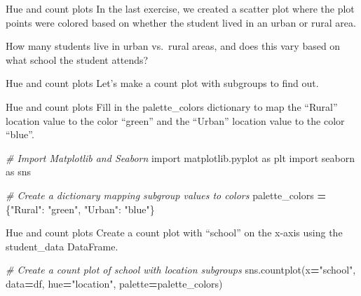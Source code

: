 \documentclass[
  ignorenonframetext,
]{beamer}
\newenvironment{Shaded}{\begin{snugshade}}{\end{snugshade}}
\newcommand{\CommentTok}[1]{\textcolor[rgb]{0.56,0.35,0.01}{\textit{#1}}}
\newcommand{\ImportTok}[1]{#1}
\newcommand{\NormalTok}[1]{#1}
\newcommand{\OperatorTok}[1]{\textcolor[rgb]{0.81,0.36,0.00}{\textbf{#1}}}
\newcommand{\StringTok}[1]{\textcolor[rgb]{0.31,0.60,0.02}{#1}}
\begin{document}
\begin{frame}{Hue and count plots}
\label{hue-and-count-plots-1}
In the last exercise, we created a scatter plot where the plot points
were colored based on whether the student lived in an urban or rural
area.

How many students live in urban vs.~rural areas, and does this vary
based on what school the student attends?
\end{frame}

\begin{frame}{Hue and count plots}
\label{hue-and-count-plots-2}
Let's make a count plot with subgroups to find out.
\end{frame}

\begin{frame}[fragile]{Hue and count plots}
\label{hue-and-count-plots-3}
Fill in the palette\_colors dictionary to map the ``Rural'' location
value to the color ``green'' and the ``Urban'' location value to the
color ``blue''.


\begin{Shaded}
\begin{Highlighting}[]
\CommentTok{\# Import Matplotlib and Seaborn}
\ImportTok{import}\NormalTok{ matplotlib.pyplot }\ImportTok{as}\NormalTok{ plt}
\ImportTok{import}\NormalTok{ seaborn }\ImportTok{as}\NormalTok{ sns}

\CommentTok{\# Create a dictionary mapping subgroup values to colors}
\NormalTok{palette\_colors }\OperatorTok{=}\NormalTok{ \{}\StringTok{"Rural"}\NormalTok{: }\StringTok{"green"}\NormalTok{, }\StringTok{"Urban"}\NormalTok{: }\StringTok{"blue"}\NormalTok{\}}
\end{Highlighting}
\end{Shaded}
\end{frame}

\begin{frame}[fragile]{Hue and count plots}
\label{hue-and-count-plots-4}
Create a count plot with ``school'' on the x-axis using the
student\_data DataFrame.


\begin{Shaded}
\begin{Highlighting}[]
\CommentTok{\# Create a count plot of school with location subgroups}
\NormalTok{sns.countplot(x}\OperatorTok{=}\StringTok{"school"}\NormalTok{, data}\OperatorTok{=}\NormalTok{df,}
\NormalTok{              hue}\OperatorTok{=}\StringTok{"location"}\NormalTok{,}
\NormalTok{              palette}\OperatorTok{=}\NormalTok{palette\_colors)}
\end{Highlighting}
\end{Shaded}
\end{frame}
\end{document}
